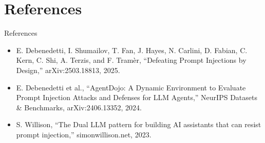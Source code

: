 \documentclass{beamer}
\begin{document}
\section{References}
\begin{frame}{References}
\footnotesize
\begin{itemize}
\item E. Debenedetti, I. Shumailov, T. Fan, J. Hayes, N. Carlini, D. Fabian, C. Kern, C. Shi, A. Terzis, and F. Tram\`{e}r, ``Defeating Prompt Injections by Design,'' arXiv:2503.18813, 2025.
\item E. Debenedetti et al., ``AgentDojo: A Dynamic Environment to Evaluate Prompt Injection Attacks and Defenses for LLM Agents,'' NeurIPS Datasets \& Benchmarks, arXiv:2406.13352, 2024.
\item S. Willison, ``The Dual LLM pattern for building AI assistants that can resist prompt injection,'' simonwillison.net, 2023.
\end{itemize}
\end{frame}
\begin{frame}\vfill{}\vfill\end{frame}
\end{document}
